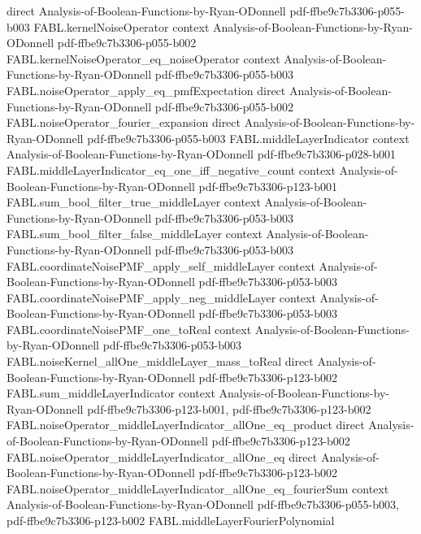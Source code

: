 \begin{theorem}
  {direct}
  {Analysis-of-Boolean-Functions-by-Ryan-ODonnell}
  {pdf-ffbe9c7b3306-p055-b003}
\proofstep
  {FABL.kernelNoiseOperator}
  {context}
  {Analysis-of-Boolean-Functions-by-Ryan-ODonnell}
  {pdf-ffbe9c7b3306-p055-b002}
\proofstep
  {FABL.kernelNoiseOperator_eq_noiseOperator}
  {context}
  {Analysis-of-Boolean-Functions-by-Ryan-ODonnell}
  {pdf-ffbe9c7b3306-p055-b003}
\proofstep
  {FABL.noiseOperator_apply_eq_pmfExpectation}
  {direct}
  {Analysis-of-Boolean-Functions-by-Ryan-ODonnell}
  {pdf-ffbe9c7b3306-p055-b002}
\proofstep
  {FABL.noiseOperator_fourier_expansion}
  {direct}
  {Analysis-of-Boolean-Functions-by-Ryan-ODonnell}
  {pdf-ffbe9c7b3306-p055-b003}
\proofstep
  {FABL.middleLayerIndicator}
  {context}
  {Analysis-of-Boolean-Functions-by-Ryan-ODonnell}
  {pdf-ffbe9c7b3306-p028-b001}
\proofstep
  {FABL.middleLayerIndicator_eq_one_iff_negative_count}
  {context}
  {Analysis-of-Boolean-Functions-by-Ryan-ODonnell}
  {pdf-ffbe9c7b3306-p123-b001}
\proofstep
  {FABL.sum_bool_filter_true_middleLayer}
  {context}
  {Analysis-of-Boolean-Functions-by-Ryan-ODonnell}
  {pdf-ffbe9c7b3306-p053-b003}
\proofstep
  {FABL.sum_bool_filter_false_middleLayer}
  {context}
  {Analysis-of-Boolean-Functions-by-Ryan-ODonnell}
  {pdf-ffbe9c7b3306-p053-b003}
\proofstep
  {FABL.coordinateNoisePMF_apply_self_middleLayer}
  {context}
  {Analysis-of-Boolean-Functions-by-Ryan-ODonnell}
  {pdf-ffbe9c7b3306-p053-b003}
\proofstep
  {FABL.coordinateNoisePMF_apply_neg_middleLayer}
  {context}
  {Analysis-of-Boolean-Functions-by-Ryan-ODonnell}
  {pdf-ffbe9c7b3306-p053-b003}
\proofstep
  {FABL.coordinateNoisePMF_one_toReal}
  {context}
  {Analysis-of-Boolean-Functions-by-Ryan-ODonnell}
  {pdf-ffbe9c7b3306-p053-b003}
\proofstep
  {FABL.noiseKernel_allOne_middleLayer_mass_toReal}
  {direct}
  {Analysis-of-Boolean-Functions-by-Ryan-ODonnell}
  {pdf-ffbe9c7b3306-p123-b002}
\proofstep
  {FABL.sum_middleLayerIndicator}
  {context}
  {Analysis-of-Boolean-Functions-by-Ryan-ODonnell}
  {pdf-ffbe9c7b3306-p123-b001,
    pdf-ffbe9c7b3306-p123-b002}
\proofstep
  {FABL.noiseOperator_middleLayerIndicator_allOne_eq_product}
  {direct}
  {Analysis-of-Boolean-Functions-by-Ryan-ODonnell}
  {pdf-ffbe9c7b3306-p123-b002}
\proofstep
  {FABL.noiseOperator_middleLayerIndicator_allOne_eq}
  {direct}
  {Analysis-of-Boolean-Functions-by-Ryan-ODonnell}
  {pdf-ffbe9c7b3306-p123-b002}
\proofstep
  {FABL.noiseOperator_middleLayerIndicator_allOne_eq_fourierSum}
  {context}
  {Analysis-of-Boolean-Functions-by-Ryan-ODonnell}
  {pdf-ffbe9c7b3306-p055-b003,
    pdf-ffbe9c7b3306-p123-b002}
\proofstep
  {FABL.middleLayerFourierPolynomial}

\end{theorem}
